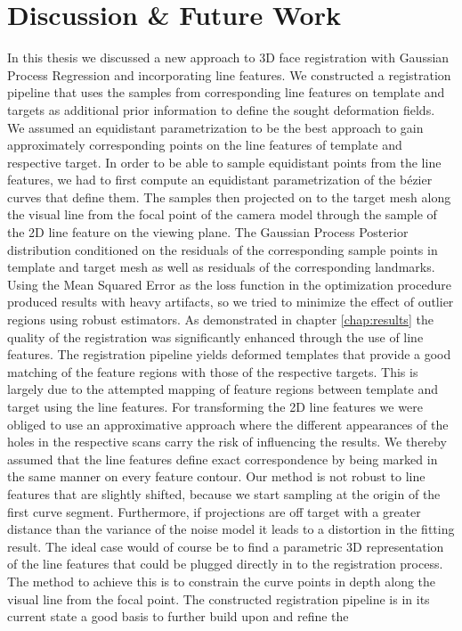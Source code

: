 \chapter{Discussion \& Future Work}
In this thesis we discussed a new approach to 3D face registration with Gaussian Process Regression and incorporating line features. We constructed a registration pipeline that uses the samples from corresponding line features on template and targets as additional prior information to define the sought deformation fields. We assumed an equidistant parametrization to be the best approach to gain approximately corresponding points on the line features of template and respective target. In order to be able to sample equidistant
points from the line features, we had to first compute an equidistant parametrization of the b\'{e}zier curves that define them. The samples then projected on to the target mesh along the visual line from the focal point of the camera model through the sample of the 2D line feature on the viewing plane. 
The Gaussian Process Posterior distribution conditioned on the residuals of the corresponding sample points in template and target mesh as well as residuals of the  corresponding landmarks. Using the Mean Squared Error as the loss function in the optimization procedure produced results with heavy artifacts, so we tried to minimize the effect of outlier regions using robust estimators.
As demonstrated in chapter \ref{chap:results} the quality of the registration was significantly enhanced through the use of line features. The registration pipeline yields deformed templates that provide a good matching of the feature regions with those of the respective targets. This is largely due to the attempted mapping of feature regions between template and target using the line features. For
transforming the 2D line features we were obliged to use an approximative approach where the different appearances of the holes in the respective scans carry the risk of influencing the results. We thereby assumed that the line features define exact correspondence by being marked in the same manner on every feature contour. Our method is not robust to line features that are slightly shifted, because we start sampling at the origin of the first curve segment.
Furthermore, if projections are off target with a greater distance than the variance of the noise model it leads to a distortion in the fitting result.
The ideal case would of course be to find a parametric 3D representation of the line features that could be plugged directly in to the registration process. The method to achieve this is to constrain the curve points in depth along the visual line from the focal point. The constructed registration pipeline is in its current state a good basis to further build upon and refine the
